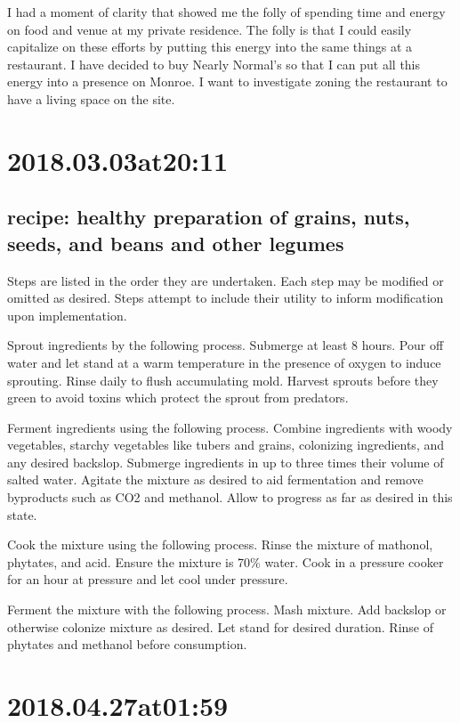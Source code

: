 I had a moment of clarity that showed me the folly of spending time and energy on food and venue at my private residence. The folly is that I could easily capitalize on these efforts by putting this energy into the same things at a restaurant. I have decided to buy Nearly Normal's so that I can put all this energy into a presence on Monroe. I want to investigate zoning the restaurant to have a living space on the site.

\section*{ 2018.03.03at20:11 }
\subsection*{ recipe: healthy preparation of grains, nuts, seeds, and beans and other legumes }
Steps are listed in the order they are undertaken.
Each step may be modified or omitted as desired.
Steps attempt to include their utility to inform modification upon implementation.

Sprout ingredients by the following process.
Submerge at least 8 hours.
Pour off water and let stand at a warm temperature in the presence of oxygen to induce sprouting.
Rinse daily to flush accumulating mold.
Harvest sprouts before they green to avoid toxins which protect the sprout from predators.

Ferment ingredients using the following process.
Combine ingredients with woody vegetables, starchy vegetables like tubers and grains, colonizing ingredients, and any desired backslop.
Submerge ingredients in up to three times their volume of salted water.
Agitate the mixture as desired to aid fermentation and remove byproducts such as CO2 and methanol.
Allow to progress as far as desired in this state.

Cook the mixture using the following process.
Rinse the mixture of mathonol, phytates, and acid.
Ensure the mixture is 70\% water.
Cook in a pressure cooker for an hour at pressure and let cool under pressure.

Ferment the mixture with the following process.
Mash mixture.
Add backslop or otherwise colonize mixture as desired.
Let stand for desired duration.
Rinse of phytates and methanol before consumption.

\section*{ 2018.04.27at01:59 }
